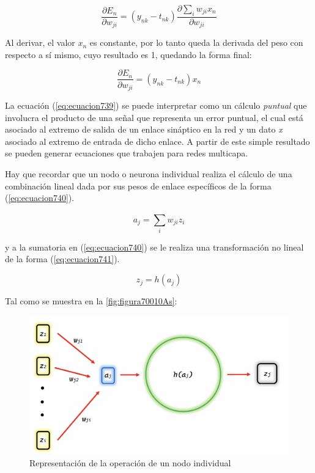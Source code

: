 {\begin{equation}
	\frac{\partial{E_n}}{\partial{w_{ji}}}=({y_{nk} - t_{nk}}) \frac{\partial{\sum_{i}^{} {w_{ji}x_{n}}}}{\partial{w_{ji}}}
	\label{eq:ecuacion567736}
\end{equation}

Al derivar, el valor $x_n$ es constante, por lo tanto queda la derivada del peso con respecto a sí mismo, cuyo resultado es 1, quedando la forma final:

\begin{equation}
	\frac{\partial{E_n}}{\partial{w_{ji}}}=(y_{nk} - t_{nk}) x_{n}
	\label{eq:ecuacion739}
\end{equation}

La ecuación (\ref{eq:ecuacion739}) se puede interpretar como un cálculo \textit{puntual} que involucra el producto de una señal que representa un error puntual, el cual está asociado al extremo de salida de un enlace sináptico 
en la red y un dato \textit{x} asociado al extremo de entrada de dicho enlace. A partir de este simple resultado se pueden generar ecuaciones que trabajen para redes multicapa. 

Hay que recordar que un nodo o neurona individual realiza el cálculo de una combinación lineal dada por sus pesos de enlace específicos de la forma (\ref{eq:ecuacion740}).

\begin{equation}
	a_j=\sum_{i}^{} {w_{ji} z_{i}}
	\label{eq:ecuacion740}
\end{equation}

y a la sumatoria en (\ref{eq:ecuacion740}) se le realiza una transformación no lineal de la forma (\ref{eq:ecuacion741}).

\begin{equation}
	z_j=h(a_j)
	\label{eq:ecuacion741}
\end{equation}

Tal como se muestra en la \autoref{fig:figura70010As}:

\begin{figure}[h]
	\centering
	\includegraphics[scale=0.7]{imgss221.png}
	\caption{Representación de la operación de un nodo individual}
	\label{fig:figura70010As}
\end{figure}

}
